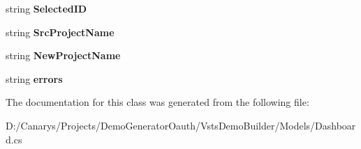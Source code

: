 \begin{DoxyCompactItemize}
\item 
\mbox{\label{class_vsts_demo_builder_1_1_models_1_1_dashboard_a9ed85c4105f240d8d89dcbe1fd49c10a}} 
string {\bfseries Selected\+ID}
\item 
\mbox{\label{class_vsts_demo_builder_1_1_models_1_1_dashboard_a0f5889ddb5f53fe7c5642a877559be3f}} 
string {\bfseries Src\+Project\+Name}
\item 
\mbox{\label{class_vsts_demo_builder_1_1_models_1_1_dashboard_ae481413d4d32703e46e35b4ab7e1d541}} 
string {\bfseries New\+Project\+Name}
\item 
\mbox{\label{class_vsts_demo_builder_1_1_models_1_1_dashboard_afb9f0dcd0ea528f3241a555d9cf457cd}} 
string {\bfseries errors}
\end{DoxyCompactItemize}


The documentation for this class was generated from the following file\+:\begin{DoxyCompactItemize}
\item 
D\+:/\+Canarys/\+Projects/\+Demo\+Generator\+Oauth/\+Vsts\+Demo\+Builder/\+Models/Dashboard.\+cs\end{DoxyCompactItemize}
